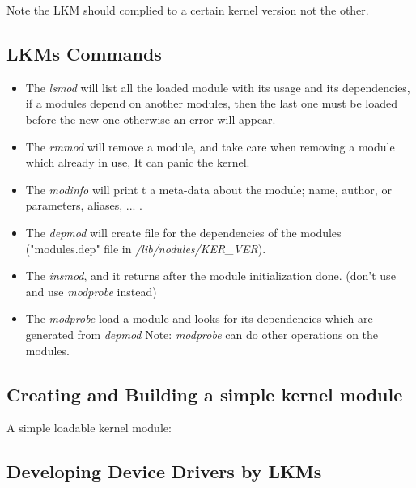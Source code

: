 \documentclass{article}
\begin{document}
Note the LKM should complied to a certain kernel version not the other.

\subsection{LKMs Commands}
\begin{itemize}
    \item The \textit{lsmod} will list all the loaded module with its usage and its dependencies, if a modules depend on another modules, then the last one must be loaded before the new one otherwise an error will appear.
    
    \item The \textit{rmmod} will remove a module, and take care when removing a module which already in use, It can panic the kernel.\\
    \item The \textit{modinfo} will print t a meta-data about the module; name, author, or parameters, aliases, ... .
    \item The \textit{depmod} will create file for the dependencies of the modules ("modules.dep" file in \textit{/lib/nodules/KER\_VER}).
    \item The \textit{insmod}, and it returns after the module initialization done. (don't use and use \textit{modprobe} instead)
    \item The \textit{modprobe} load a module and looks for its dependencies which are generated from \textit{depmod}
    Note: \textit{modprobe} can do other operations on the modules.

\end{itemize}

\subsection{Creating and Building a simple kernel module}

A simple loadable kernel module:





\subsection{Developing Device Drivers by LKMs}
\end{document}
